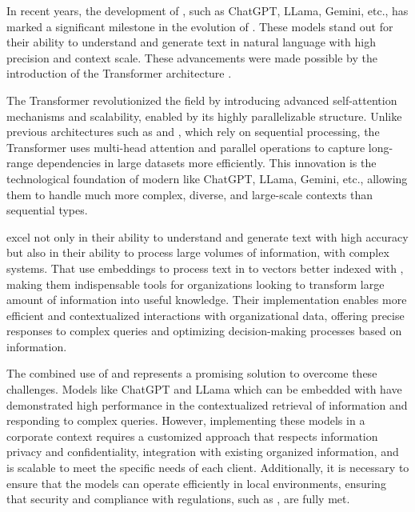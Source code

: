 In recent years, the development of , such as ChatGPT, LLama, Gemini, etc., has marked a significant milestone in the evolution of . These models stand out for their ability to understand and generate text in natural language with high precision and context scale. These advancements were made possible by the introduction of the Transformer architecture \cite{vaswani2017attention}.

The Transformer revolutionized the field by introducing advanced self-attention mechanisms and scalability, enabled by its highly parallelizable structure. Unlike previous architectures such as  and , which rely on sequential processing, the Transformer uses multi-head attention and parallel operations to capture long-range dependencies in large datasets more efficiently. This innovation is the technological foundation of modern  like ChatGPT, LLama, Gemini, etc., allowing them to handle much more complex, diverse, and large-scale contexts than sequential types.

 excel not only in their ability to understand and generate text with high accuracy but also in their ability to process large volumes of information, with complex  systems. That use embeddings to process text in to vectors better indexed with , making them indispensable tools for organizations looking to transform large amount of information into useful knowledge. Their implementation enables more efficient and contextualized interactions with organizational data, offering precise responses to complex queries and optimizing decision-making processes based on information.

The combined use of  and  represents a promising solution to overcome these challenges. Models like ChatGPT and LLama which can be embedded with  have demonstrated high performance in the contextualized retrieval of information and responding to complex queries. However, implementing these models in a corporate context requires a customized approach that respects information privacy and confidentiality, integration with existing organized information, and is scalable to meet the specific needs of each client. Additionally, it is necessary to ensure that the models can operate efficiently in local environments, ensuring that security and compliance with regulations, such as , are fully met.

